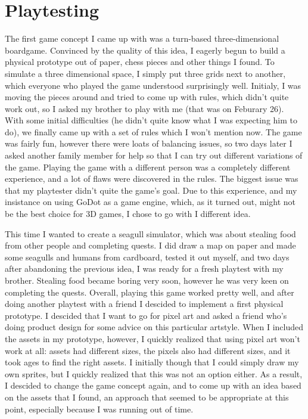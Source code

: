 \documentclass{article}
\begin{document}
\section{Playtesting}
The first game concept I came up with was a turn-based three-dimensional boardgame. Convinced by the quality of this idea, I eagerly begun to build a physical prototype out of paper, chess pieces and other things I found. To simulate a three dimensional space, I simply put three grids next to another, which everyone who played the game understood surprisingly well. Initialy, I was moving the pieces around and tried to come up with rules, which didn't quite work out, so I asked my brother to play with me (that was on Feburary 26). With some initial difficulties (he didn't quite know what I was expecting him to do), we finally came up with a set of rules which I won't mention now. The game was fairly fun, however there were loats of balancing issues, so two days later I asked another family member for help so that I can try out different variations of the game. Playing the game with a different person was a completely different experience, and a lot of flaws were discovered in the rules. The biggest issue was that my playtester didn't quite the game's goal. Due to this experience, and my insistance on using GoDot as a game engine, which, as it turned out, might not be the best choice for 3D games, I chose to go with I different idea.

\bigskip
This time I wanted to create a seagull simulator, which was about stealing food from other people and completing quests. I did draw a map on paper and made some seagulls and humans from cardboard, tested it out myself, and two days after abandoning the previous idea, I was ready for a fresh playtest with my brother. Stealing food became boring very soon, however he was very keen on completing the quests. Overall, playing this game worked pretty well, and after doing another playtest with a friend I descided to implement a first physical prototype.
I descided that I want to go for pixel art and asked a friend who's doing product design for some advice on this particular artstyle. When I included the assets in my prototype, however, I quickly realized that using pixel art won't work at all: assets had different sizes, the pixels also had different sizes, and it took ages to find the right assets. I initially though that I could simply draw my own sprites, but I quickly realized that this was not an option either. As a result, I descided to change the game concept again, and to come up with an idea based on the assets that I found, an approach that seemed to be appropriate at this point, especially because I was running out of time.
\end{document}
